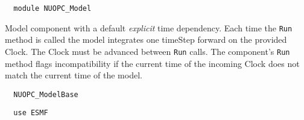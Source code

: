  
\setlength{\parskip}{0pt}
\setlength{\parindent}{0pt}
\setlength{\baselineskip}{11pt}
 
\def\bv{\begin{verbatim}}
\def\ev{\end{verbatim}}
\def\be{\begin{equation}}
\def\ee{\end{equation}}
\def\bea{\begin{eqnarray}}
\def\eea{\end{eqnarray}}
\def\bi{\begin{itemize}}
\def\ei{\end{itemize}}
\def\bn{\begin{enumerate}}
\def\en{\end{enumerate}}
\def\bd{\begin{description}}
\def\ed{\end{description}}
\def\({\left (}
\def\){\right )}
\def\[{\left [}
\def\]{\right ]}
\def\<{\left  \langle}
\def\>{\right \rangle}
\def\cI{{\cal I}}
\def\diag{\mathop{\rm diag}}
\def\tr{\mathop{\rm tr}}


\begin{verbatim}  module NUOPC_Model
\end{verbatim}

Model component with a default {\em explicit} time dependency. Each time the {\tt Run} method is called the model integrates one timeStep forward on the provided Clock. The Clock must be advanced between {\tt Run} calls. The component's {\tt Run} method flags incompatibility if the current time of the incoming Clock does not match the current time of the model.

\begin{verbatim}  NUOPC_ModelBase
\end{verbatim}

\begin{verbatim}  use ESMF
\end{verbatim}

